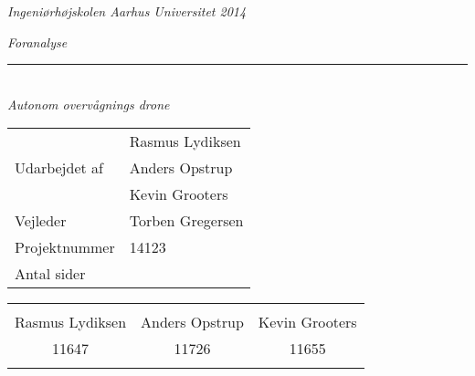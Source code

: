 \thispagestyle{empty}

\begin{center}
\textsl{Ingeniørhøjskolen Aarhus Universitet 2014 } \\ \vspace{0.5cm}

\phantom{hul}
\phantom{hul}
\phantom{hul}
\phantom{hul}
\phantom{hul}
\phantom{hul}
\phantom{hul}

\textsl{\HUGE Foranalyse } \\ \vspace{0cm}
\rule{15cm}{0.5mm}  \\ \vspace{0.5cm}
\textsl{\LARGE Autonom overvågnings drone } \\ \vspace{0.5cm}

\vspace{2.5cm}

\begin{table}[h]
\begin{tabular}{l|l}
\hline

 						&	Rasmus Lydiksen 				\\
Udarbejdet af \hspace{5cm} &	Anders Opstrup  \hspace{3.8cm}	\\
 						&  	Kevin Grooters					\\ \hline

Vejleder				&	Torben Gregersen 				\\ \hline
Projektnummer			&	14123 			 				\\ \hline
Antal sider				&	\pageref{LastPage} 				\\ \hline
\end{tabular}
\end{table}

\vspace{8cm}

\begin{table}[H]
	\centering
		\begin{tabular}{c c c}
			\underline{\phantom{mmmmmmmmmmmmmm}} & \underline{\phantom{mmmmmmmmmmmmmm}} & \underline{\phantom{mmmmmmmmmmmmmm}} \\
			Rasmus Lydiksen			& Anders Opstrup 		& Kevin Grooters 			\\
			11647					& 11726					& 11655\\
			&&\\												
		\end{tabular}
\end{table}
\end{center}